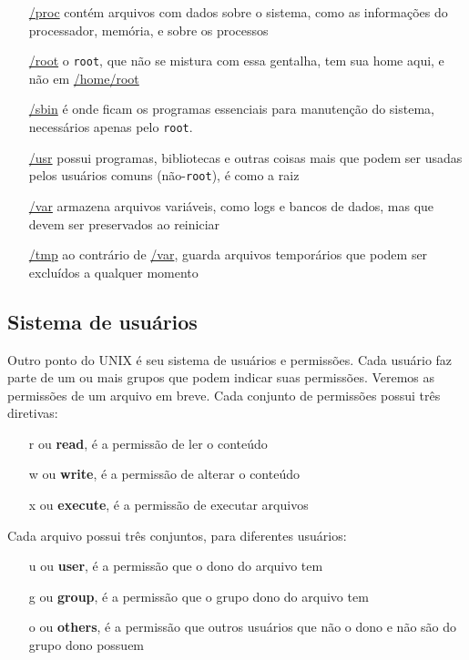 \documentclass{beamer}
\begin{document}
\begin{frame}
	
	\begin{itemize}
		\item[\url{/proc}] contém arquivos com dados sobre o sistema,	como as
			informações do processador, memória, e sobre os processos
		\item[\url{/root}] o \texttt{root}, que não se mistura com essa gentalha,
			tem sua home aqui, e não em \url{/home/root}
		\item[\url{/sbin}] é onde ficam os programas essenciais para manutenção
			do sistema, necessários apenas pelo \texttt{root}.
		\item[\url{/usr}] possui programas, bibliotecas e outras coisas mais que
			podem ser usadas pelos usuários comuns (não-\texttt{root}), é como a raiz
		\item[\url{/var}] armazena arquivos variáveis, como logs e bancos de dados,
			mas que devem ser preservados ao reiniciar
		\item[\url{/tmp}] ao contrário de \url{/var}, guarda arquivos temporários
			que podem ser excluídos a qualquer momento
	\end{itemize}

\end{frame}

\subsection{Sistema de usuários}

\begin{frame}

	Outro ponto do UNIX é seu sistema de usuários e permissões. Cada usuário faz
	parte de um ou mais grupos que podem indicar suas permissões. Veremos as
	permissões de um arquivo em breve.
	\newline
	\newline
	Cada conjunto de permissões possui três diretivas:
	\begin{itemize}
		\item[r] ou \textbf{read}, é a permissão de ler o conteúdo
		\item[w] ou \textbf{write}, é a permissão de alterar o conteúdo
		\item[x] ou \textbf{execute}, é a permissão de executar arquivos
	\end{itemize}
	Cada arquivo possui três conjuntos, para diferentes usuários:
	\begin{itemize}
		\item[u] ou \textbf{user}, é a permissão que o dono do arquivo tem
		\item[g] ou \textbf{group}, é a permissão que o grupo dono do arquivo tem
		\item[o] ou \textbf{others}, é a permissão que outros usuários que não o
			dono e não são do grupo dono possuem
	\end{itemize}

\end{frame}
\end{document}
